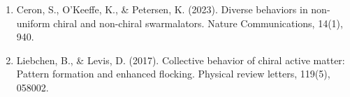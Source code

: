 \documentclass{article}
\begin{document}
\begin{enumerate}
    \renewcommand{\theenumi}{[\arabic{enumi}]}
    \renewcommand{\labelenumi}{\theenumi}
    \item Ceron, S., O'Keeffe, K., \& Petersen, K. (2023). Diverse behaviors in non-uniform chiral and non-chiral swarmalators. Nature Communications, 14(1), 940.
    \item Liebchen, B., \& Levis, D. (2017). Collective behavior of chiral active matter: Pattern formation and enhanced flocking. Physical review letters, 119(5), 058002.
\end{enumerate}
\end{document}
